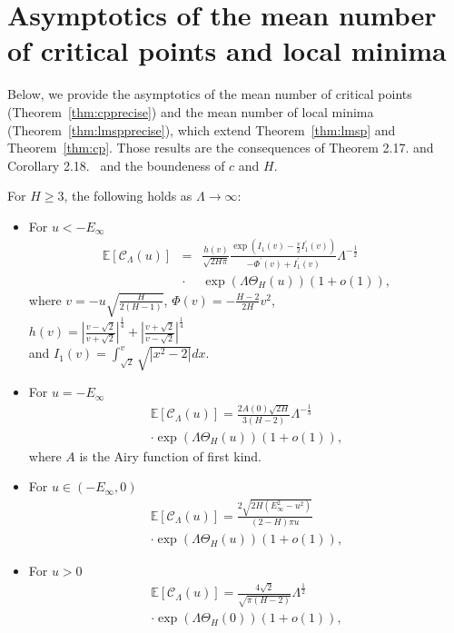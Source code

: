 \documentclass[twoside]{article}
\begin{document}
\section{Asymptotics of the mean number of critical points and local minima}

Below, we provide the asymptotics of the mean number of critical points (Theorem~\ref{thm:cpprecise}) and the mean number of local minima (Theorem~\ref{thm:lmspprecise}), which extend Theorem~\ref{thm:lmsp} and Theorem~\ref{thm:cp}. Those results are the consequences of Theorem 2.17. and Corollary 2.18.~\cite{AAC2010} and the boundeness of $c$ and $H$.
\begin{theorem}
For $H \geq 3$, the following holds as $\Lambda \rightarrow \infty$:
\begin{itemize}
\item For $u < -E_{\infty}$\\
\begin{eqnarray*}
\mathbb{E}[\mathcal{C}_{\Lambda}(u)] \!\!\!&=&\!\!\! \frac{h(v)}{\sqrt{2H\pi}}\frac{\exp(I_1(v) - \frac{v}{2}I_1^{'}(v))}{-\Phi^{'}(v) + I_1^{'}(v)}\Lambda^{-\frac{1}{2}}\\
&\cdot& \exp\left(\Lambda\Theta_H(u)\right)(1 + o(1)),
\end{eqnarray*}
where $v = -u\sqrt{\frac{H}{2(H-1)}}$, $\Phi(v) = -\frac{H-2}{2H}v^2$,\\
$h(v) = \left|\frac{v-\sqrt{2}}{v + \sqrt{2}}\right|^{\frac{1}{4}} + \left|\frac{v+\sqrt{2}}{v - \sqrt{2}}\right|^{\frac{1}{4}}$\\
and $I_1(v) = \int_{\sqrt{2}}^{v}\sqrt{|x^2 - 2|}dx$.
\item For $u = -E_{\infty}$\\
\begin{eqnarray*}
\mathbb{E}[\mathcal{C}_{\Lambda}(u)] = \frac{2A(0)\sqrt{2H}}{3(H-2)}\Lambda^{-\frac{1}{3}}\\
\cdot\exp\left(\Lambda\Theta_H(u)\right)(1 + o(1)),
\end{eqnarray*}
where $A$ is the Airy function of first kind.
\item For $u \in (-E_{\infty},0)$\\
\begin{eqnarray*}
\mathbb{E}[\mathcal{C}_{\Lambda}(u)] = \frac{2\sqrt{2H(E_{\infty}^2-u^2)}}{(2-H)\pi u}\\
\cdot\exp\left(\Lambda \Theta_H(u)\right)(1 + o(1)),
\end{eqnarray*}
\item For $u > 0$\\
\begin{eqnarray*}
\mathbb{E}[\mathcal{C}_{\Lambda}(u)] = \frac{4\sqrt{2}}{\sqrt{\pi(H-2)}}\Lambda^{\frac{1}{2}}\\
\cdot\exp\left(\Lambda\Theta_H(0)\right)(1 + o(1)),
\end{eqnarray*}
\end{itemize}
\label{thm:cpprecise}
\end{theorem}
\end{document}
